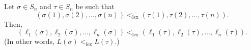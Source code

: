 \begin{proposition}
\label{prop.perm.lehmer.lex}Let $\sigma\in S_{n}$ and $\tau\in S_{n}$ be such
that
\begin{equation}
\left(  \sigma\left(  1\right)  ,\sigma\left(  2\right)  ,\ldots,\sigma\left(
n\right)  \right)  <_{\operatorname*{lex}}\left(  \tau\left(  1\right)
,\tau\left(  2\right)  ,\ldots,\tau\left(  n\right)  \right)  .
\label{eq.prop.perm.lehmer.lex.ass}%
\end{equation}
Then,
\begin{equation}
\left(  \ell_{1}\left(  \sigma\right)  ,\ell_{2}\left(  \sigma\right)
,\ldots,\ell_{n}\left(  \sigma\right)  \right)  <_{\operatorname*{lex}}\left(
\ell_{1}\left(  \tau\right)  ,\ell_{2}\left(  \tau\right)  ,\ldots,\ell
_{n}\left(  \tau\right)  \right)  . \label{eq.prop.perm.lehmer.lex.clm}%
\end{equation}
(In other words, $L\left(  \sigma\right)  <_{\operatorname*{lex}}L\left(
\tau\right)  $.)
\end{proposition}


